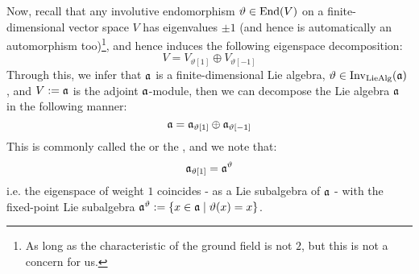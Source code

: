         Now, recall that any involutive endomorphism $\vartheta \in \operatorname{End}(V)$ on a finite-dimensional vector space $V$ has eigenvalues $\pm 1$ (and hence is automatically an automorphism too)\footnote{As long as the characteristic of the ground field is not $2$, but this is not a concern for us.}, and hence induces the following eigenspace decomposition:
            $$V = V_{\vartheta[1]} \oplus V_{\vartheta[-1]}$$
        Through this, we infer that $\mathfrak{a}$ is a finite-dimensional Lie algebra, $\vartheta \in \operatorname{Inv}_{\mathrm{Lie}\mathrm{Alg}}(\mathfrak{a})$ , and $V := \mathfrak{a}$ is the adjoint $\mathfrak{a}$-module, then we can decompose the Lie algebra $\mathfrak{a}$ in the following manner:
            \begin{equation} \label{equation: symmetric_space_decomposition}
                \mathfrak{a} = \mathfrak{a}_{\vartheta[1]} \oplus \mathfrak{a}_{\vartheta[-1]}
            \end{equation}
        This is commonly called the  or the , and we note that:
            $$\mathfrak{a}_{\vartheta[1]} = \mathfrak{a}^{\vartheta}$$
        i.e. the eigenspace of weight $1$ coincides - as a Lie subalgebra of $\mathfrak{a}$ - with the fixed-point Lie subalgebra $\mathfrak{a}^{\vartheta} := \{x \in \mathfrak{a} \mid \vartheta(x) = x\}$.

